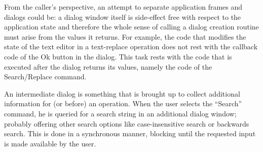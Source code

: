 \documentclass[twocolumn,a4paper]{article}
\newcommand {\concept} [1] {{\sl #1}\index{#1}}
\newcommand {\CLIM}{\textsc{clim}}
\begin{document}
From the caller's perspective, an attempt to separate application
frames and dialogs could be: a dialog window itself is side-effect
free with respect to the application state and therefore the whole
sense of calling a dialog creation routine must arise from the values
it returns. For example, the code that modifies the state of the text
editor in a text-replace operation does not rest with the callback
code of the Ok button in the dialog. This task rests with the code
that is executed after the dialog returns its values, namely the code
of the Search/Replace command.


An intermediate dialog is something that is brought up to collect
additional information for (or before) an operation. When the user
selects the ``Search'' command, he is queried for a search string in
an additional dialog window; probably offering other search options
like case-insensitive search or backwards search. This is done in a
synchronous manner, blocking until the requested input is made
available by the user.


\end{document}
